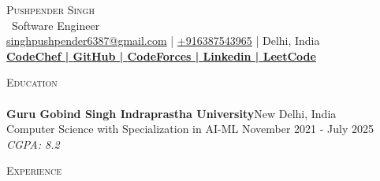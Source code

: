 \documentclass[a4paper]{article}
\newcommand{\lineunder} {
    \vspace*{-8pt} \\
    \hspace*{-18pt} \hrulefill \\
}
\newcommand{\header} [1] {
    {\hspace*{-18pt}\vspace*{6pt} \textsc{#1}}
    \vspace*{-6pt} \lineunder
}
\begin{document}
    \vspace*{-40pt}

    

%
%
  \vspace*{-2pt}
  \begin{center}
    {\Huge \scshape {Pushpender Singh}}\\
    \vspace*{2pt}
    \ {Software Engineer}\\
    \vspace*{2pt}
    \href{mailto:singhpushpender6387@gmail.com}{singhpushpender6387@gmail.com} | \href{tel:+916387543965}{+916387543965} | Delhi, India\\
    \vspace*{2pt}
    \textbf{\href{https://www.codechef.com/users/singhindia}{CodeChef | }}\textbf{\href{https://github.com/pushpenderindia}{GitHub | }}\textbf{\href{https://codeforces.com/profile/pushpenderindia}{CodeForces | }}\textbf{\href{https://linkedin.com/in/pushpenderindia}{Linkedin | }}\textbf{\href{https://leetcode.com/u/pushu\_singh}{LeetCode}}\\
  \end{center}



      \header{Education}
      \vspace{2mm}
      \textbf{Guru Gobind Singh Indraprastha University}\hfill New Delhi, India\\
Computer Science with Specialization in AI-ML \hfill November 2021 - July 2025\\
{\sl CGPA: 8.2}\\
\vspace{2mm}

      \header{Experience}
      \vspace{2mm}
\end{document}
